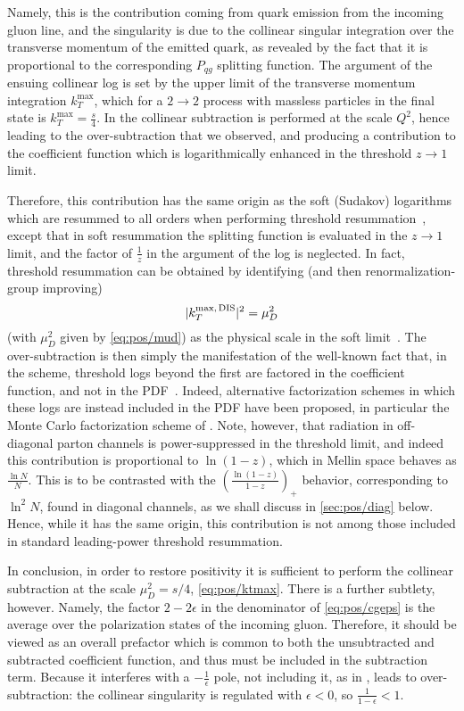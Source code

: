 Namely, this is the
contribution coming from quark emission from the incoming gluon line,
and the singularity is due to the collinear singular integration over
the transverse momentum of the emitted quark, as revealed by the fact
that it is proportional to the corresponding $P_{qg}$ splitting
function. The argument of the ensuing collinear log is set by the
upper limit of the transverse momentum integration $k_T^{\textrm{max}}$,
which for a $2\to2$ process with massless particles in the final state
is $k_T^{\textrm{max}}=\frac{s}{4}$. In \msbar{}
the collinear subtraction is performed at the scale $Q^2$,
hence leading to the over-subtraction that we observed, and producing
a contribution to the coefficient function which is logarithmically
enhanced in the threshold $z\to1$ limit.

Therefore, this contribution has the same origin as the soft (Sudakov)
logarithms 
which are resummed to all orders
when performing threshold
resummation~\cite{Catani:1989ne,Sterman:1986aj}, except that 
in soft resummation the splitting function is evaluated in the $z\to1$
limit, and the factor of $\frac{1}{z}$ in the argument of the log is
neglected.
In fact, threshold resummation can be
obtained by identifying (and then
renormalization-group improving)
\begin{equation}\label{eq:pos/ktmax}
 |k_T^{\textrm{max,\,DIS}}|^2=\mu_D^2
\end{equation}
(with $\mu_D^2$ given by \cref{eq:pos/mud})
  as the physical
scale in the soft limit~\cite{Forte:2002ni}. The over-subtraction is then
simply the manifestation of the well-known fact that, in the \msbar{} scheme,
threshold logs beyond the first are factored in the coefficient
function, and not in the PDF~\cite{Albino:2000cp}. Indeed, alternative
factorization schemes in which these logs are instead included in the
PDF have been proposed, in particular  the Monte Carlo
factorization scheme of \cite{Jadach:2016acv}. Note, however, that
radiation in off-diagonal parton channels is power-suppressed in the
threshold limit, and indeed this contribution is proportional to
$\ln(1-z)$, which in Mellin space behaves as $\frac{\ln N}{N}$. This is to be
contrasted with the $\left(\frac{\ln(1-z)}{1-z}\right)_+$ behavior, corresponding to 
$\ln^2 N$, found in diagonal channels, as we shall discuss in
\cref{sec:pos/diag} below. Hence, while it has the same origin, this
contribution is not among those included in standard leading-power
threshold resummation. 

In conclusion,  in order to
restore positivity it is  sufficient to perform the collinear
subtraction at the scale $\mu_D^2=s/4$, \cref{eq:pos/ktmax}.
There is a further subtlety, however. Namely, the factor $2-2\epsilon$
in the denominator of \cref{eq:pos/cgeps} is the average over the
polarization states of the incoming gluon. Therefore, it should be
viewed as an overall prefactor which is common to both the
unsubtracted and subtracted coefficient function, and thus  must be
included in the subtraction term. Because it interferes with a
$-\frac{1}{\epsilon}$ pole, not including it, as in \msbar{}, leads to
over-subtraction: 
the collinear singularity is regulated with
$\epsilon<0$, so $\frac{1}{1-\epsilon}<1$.  

